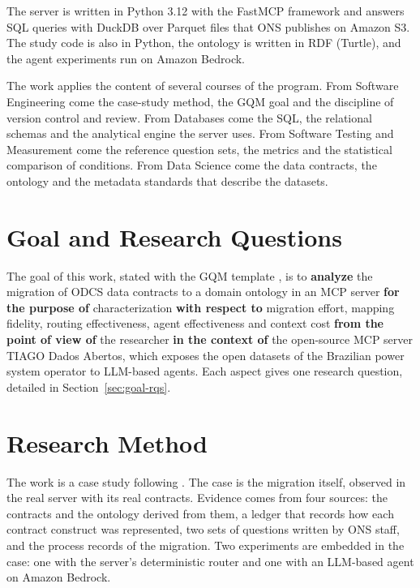 The server is written in Python 3.12 with the FastMCP framework and answers SQL queries
with DuckDB over Parquet files that ONS publishes on Amazon S3. The study code is also in
Python, the ontology is written in RDF (Turtle), and the agent experiments run on Amazon
Bedrock.

The work applies the content of several courses of the program. From Software Engineering
come the case-study method, the GQM goal and the discipline of version control and review.
From Databases come the SQL, the relational schemas and the analytical engine the server
uses. From Software Testing and Measurement come the reference question sets, the metrics
and the statistical comparison of conditions. From Data Science come the data contracts,
the ontology and the metadata standards that describe the datasets.

\section{Goal and Research Questions}
The goal of this work, stated with the GQM template \cite{basili1988tame}, is to
\textbf{analyze} the migration of ODCS data contracts to a domain ontology in an MCP server
\textbf{for the purpose of} characterization \textbf{with respect to} migration effort,
mapping fidelity, routing effectiveness, agent effectiveness and context cost
\textbf{from the point of view of} the researcher \textbf{in the context of} the
open-source MCP server TIAGO Dados Abertos, which exposes the open datasets of the
Brazilian power system operator to LLM-based agents. Each aspect gives one research
question, detailed in Section~\ref{sec:goal-rqs}.

\section{Research Method}
The work is a case study following . The case is the migration
itself, observed in the real server with its real contracts. Evidence comes from four
sources: the contracts and the ontology derived from them, a ledger that records how each
contract construct was represented, two sets of questions written by ONS staff, and the
process records of the migration. Two experiments are embedded in the case: one with the
server's deterministic router and one with an LLM-based agent on Amazon Bedrock.


